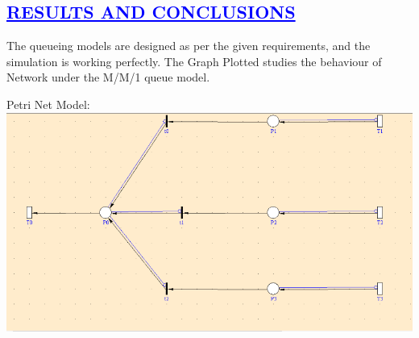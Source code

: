 \documentclass[a4paper,12pt]{report}
\begin{document}
\begin{center}
\chapter{\textcolor{blue}{\underline {RESULTS AND CONCLUSIONS}}}\end{center}
\noindent The queueing models are designed as per the given requirements, and the simulation is working perfectly. The Graph Plotted studies the behaviour of Network under 
	  the M/M/1 queue model.
\begin{center}
Petri Net Model:
 \includegraphics[width=13 cm,height=12 cm]{./assign6.PNG}
\end{center}
\end{document}
